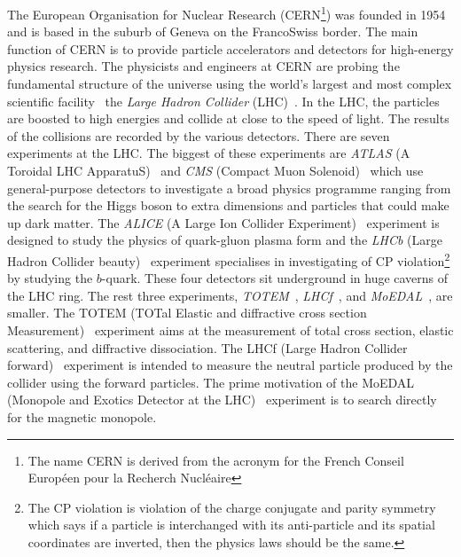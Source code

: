 The European Organisation for Nuclear Research (CERN\footnote{The name CERN is derived from the acronym for the French Conseil Europ\'{e}en pour la Recherch Nucl\'{e}aire}) was founded in 1954 and is based in the suburb of Geneva on the Franco\textendash Swiss border.
The main function of CERN is to provide particle accelerators and detectors for high-energy physics research.
The physicists and engineers at CERN are probing the fundamental structure of the universe using the world's largest and most complex scientific facility \textemdash \ the \textit{Large Hadron Collider} (LHC)~\cite{1748-0221-3-08-S08001}.
In the LHC, the particles are boosted to high energies and collide at close to the speed of light.
The results of the collisions are recorded by the various detectors.
There are seven experiments at the LHC.
The biggest of these experiments are \textit{ATLAS} (A Toroidal LHC ApparatuS)~\cite{1748-0221-3-08-S08003} and \textit{CMS} (Compact Muon Solenoid)~\cite{1748-0221-3-08-S08004} which use general-purpose detectors to investigate a broad physics programme ranging from the search for the Higgs boson to extra dimensions and particles that could make up dark matter.
The \textit{ALICE} (A Large Ion Collider Experiment)~\cite{1748-0221-3-08-S08002} experiment is designed to study the physics of quark-gluon plasma form and the \textit{LHCb} (Large Hadron Collider beauty)~\cite{1748-0221-3-08-S08005} experiment specialises in investigating of CP violation\footnote{The CP violation is violation of the charge conjugate and parity symmetry which says if a particle is interchanged with its anti-particle and its spatial coordinates are inverted, then the physics laws should be the same.} by studying the $b$-quark.
These four detectors sit underground in huge caverns of the LHC ring.
The rest three experiments, \textit{TOTEM}~\cite{1748-0221-3-08-S08007}, \textit{LHCf}~\cite{1748-0221-3-08-S08006}, and \textit{MoEDAL}~\cite{Pinfold:1181486}, are smaller.
The TOTEM (TOTal Elastic and diffractive cross section Measurement)~\cite{1748-0221-3-08-S08007} experiment aims at the measurement of total cross section, elastic scattering, and diffractive dissociation.
The LHCf (Large Hadron Collider forward)~\cite{1748-0221-3-08-S08006} experiment is intended to measure the neutral particle produced by the collider using the forward particles.
The prime motivation of the MoEDAL (Monopole and Exotics Detector at the LHC)~\cite{Pinfold:1181486} experiment is to search directly for the magnetic monopole.


